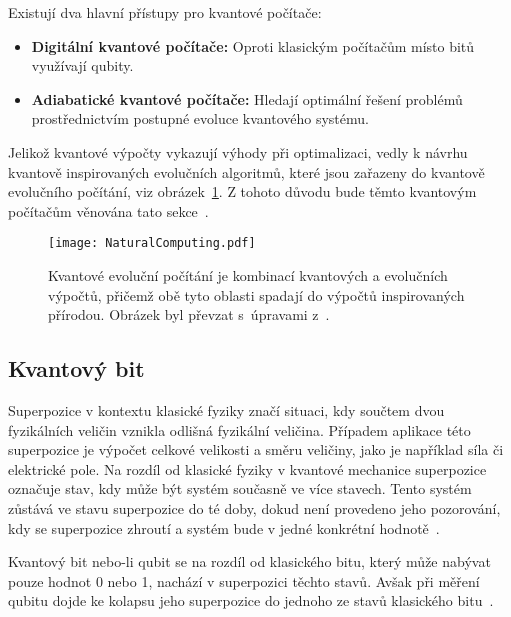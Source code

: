 Existují dva hlavní přístupy pro kvantové počítače:
\begin{itemize}
    \item \textbf{Digitální kvantové počítače:} Oproti klasickým počítačům místo bitů využívají qubity.
    \item \textbf{Adiabatické kvantové počítače:} Hledají optimální řešení problémů prostřednictvím postupné evoluce kvantového systému.
\end{itemize}

Jelikož kvantové výpočty vykazují výhody při optimalizaci, vedly k návrhu kvantově inspirovaných evolučních algoritmů, které jsou zařazeny do kvantově evolučního počítání, viz obrázek~\ref{fig:natural-computing}.
Z tohoto důvodu bude těmto kvantovým počítačům věnována tato sekce~\cite{NaturalComputing}.

\begin{figure}[ht!]
    \centering
    \texttt{[image: NaturalComputing.pdf]}
    \caption{Kvantové evoluční počítání je kombinací kvantových a evolučních výpočtů, přičemž obě tyto oblasti spadají do výpočtů inspirovaných přírodou. Obrázek byl převzat s~úpravami z~\cite{QuantumComputing-QuantumInformation}.}
    \label{fig:natural-computing}
\end{figure}

\subsection{Kvantový bit}
Superpozice v kontextu klasické fyziky značí situaci, kdy součtem dvou fyzikálních veličin vznikla odlišná fyzikální veličina. 
Případem aplikace této superpozice je výpočet celkové velikosti a směru veličiny, jako je například síla či elektrické pole.
Na rozdíl od klasické fyziky v kvantové mechanice superpozice označuje stav, kdy může být systém současně ve více stavech. 
Tento systém zůstává ve stavu superpozice do té doby, dokud není provedeno jeho pozorování, kdy se superpozice zhroutí a systém bude v jedné konkrétní hodnotě~\cite{QuantumComputing-Curious}. 

Kvantový bit nebo-li qubit se na rozdíl od klasického bitu, který může nabývat pouze hodnot 0 nebo 1, nachází v superpozici těchto stavů. 
Avšak při měření qubitu dojde ke kolapsu jeho superpozice do jednoho ze stavů klasického bitu~\cite{QuantumComputing-Curious}.  

